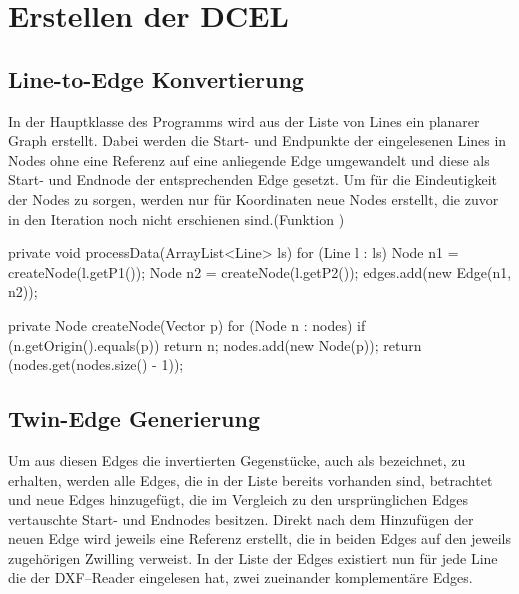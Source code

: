 \section{Erstellen der DCEL}
\subsection{Line-to-Edge Konvertierung}
\label{subsec:ltoe}
In der Hauptklasse des Programms wird aus der Liste von Lines ein planarer Graph erstellt. 
Dabei werden die Start- und Endpunkte der eingelesenen Lines in Nodes ohne eine Referenz auf eine anliegende Edge umgewandelt und diese als Start- und Endnode der entsprechenden Edge gesetzt.
Um für die Eindeutigkeit der Nodes zu sorgen, werden nur für Koordinaten neue Nodes erstellt, die zuvor in den Iteration noch nicht erschienen sind.(Funktion )

\begin{code}
private void processData(ArrayList<Line> ls) {
	for (Line l : ls) {
		Node n1 = createNode(l.getP1());
		Node n2 = createNode(l.getP2());
		edges.add(new Edge(n1, n2));
	}
}
\end{code}
\begin{code}
private Node createNode(Vector p) {
	for (Node n : nodes) {
		if (n.getOrigin().equals(p)) {
			return n;
		}
	}
	nodes.add(new Node(p));
	return (nodes.get(nodes.size() - 1));
}
\end{code}
\subsection{Twin-Edge Generierung}
Um aus diesen Edges die invertierten Gegenstücke, auch als  bezeichnet, zu erhalten, werden alle Edges, die in der Liste bereits vorhanden sind, betrachtet und neue Edges hinzugefügt, die im Vergleich zu den ursprünglichen Edges vertauschte Start- und Endnodes besitzen.
Direkt nach dem Hinzufügen der neuen Edge wird jeweils eine Referenz erstellt, die in beiden Edges auf den jeweils zugehörigen Zwilling verweist. 
In der Liste der Edges existiert nun für jede Line die der DXF--Reader eingelesen hat, zwei zueinander komplementäre Edges.
